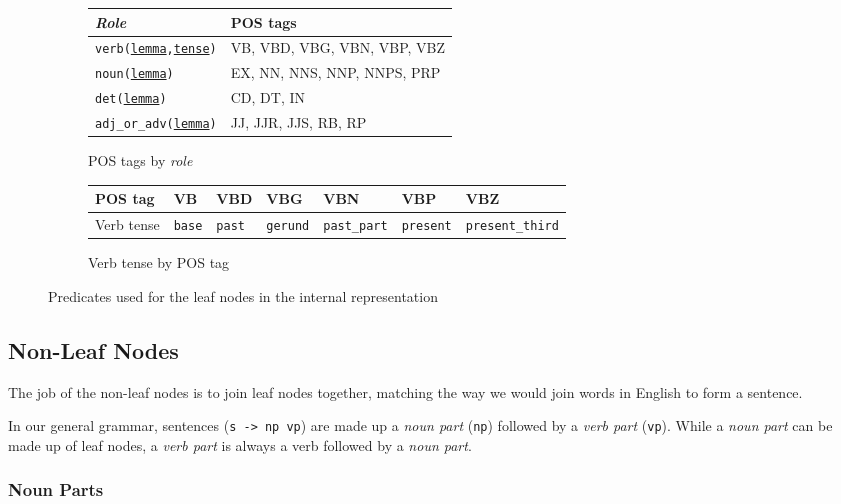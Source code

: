 \begin{figure}[H]
\begin{subfigure}{\textwidth}
\centering
\begin{tabular}{@{}ll@{}}
\toprule
\textit{Role}         & POS tags                    \\ \midrule
\texttt{verb(\underline{lemma},\underline{tense})}         & VB, VBD, VBG, VBN, VBP, VBZ \\
\texttt{noun(\underline{lemma})}         & EX, NN, NNS, NNP, NNPS, PRP \\
\texttt{det(\underline{lemma})}          & CD, DT, IN                  \\
\texttt{adj\_or\_adv(\underline{lemma})} & JJ, JJR, JJS, RB, RP        \\ \bottomrule
\end{tabular}
\caption{POS tags by \textit{role}}
\vspace{\baselineskip}
\end{subfigure}
\begin{subfigure}{\textwidth}
\centering
\begin{tabular}{@{}lllllll@{}}
\toprule
POS tag  & VB & VBD  & VBG    & VBN        & VBP     & VBZ            \\ \midrule
Verb tense & \texttt{base} & \texttt{past} & \texttt{gerund} & \texttt{past\_part} & \texttt{present} & \texttt{present\_third} \\ \bottomrule
\end{tabular}
\caption{Verb tense by POS tag}
\vspace{\baselineskip}
\end{subfigure}
\caption{Predicates used for the leaf nodes in the internal representation}
\label{fig:leaf_nodes}
\end{figure}

\subsection{Non-Leaf Nodes}

The job of the non-leaf nodes is to join leaf nodes together, matching the way we would join words in English to form a sentence.

In our general grammar, sentences (\texttt{s -> np vp}) are made up a \textit{noun part} (\texttt{np}) followed by a \textit{verb part} (\texttt{vp}). While a \textit{noun part} can be made up of leaf nodes, a \textit{verb part} is always a verb followed by a \textit{noun part}.

\subsubsection{Noun Parts}

